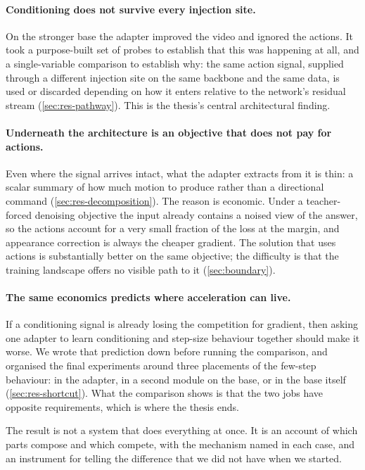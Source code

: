 \paragraph{Conditioning does not survive every injection site.} On the
stronger base the adapter improved the video and ignored the actions. It
took a purpose-built set of probes to establish that this was happening at
all, and a single-variable comparison to establish why: the same action
signal, supplied through a different injection site on the same backbone and
the same data, is used or discarded depending on how it enters relative to
the network's residual stream (\cref{sec:res-pathway}). This is the thesis's
central architectural finding.

\paragraph{Underneath the architecture is an objective that does not pay for
actions.} Even where the signal arrives intact, what the adapter extracts
from it is thin: a scalar summary of how much motion to produce rather than a
directional command (\cref{sec:res-decomposition}). The reason is economic.
Under a teacher-forced denoising objective the input already contains a
noised view of the answer, so the actions account for a very small fraction
of the loss at the margin, and appearance correction is always the cheaper
gradient. The solution that uses actions is substantially better on the same
objective; the difficulty is that the training landscape offers no visible
path to it (\cref{sec:boundary}).

\paragraph{The same economics predicts where acceleration can live.} If a
conditioning signal is already losing the competition for gradient, then
asking one adapter to learn conditioning and step-size behaviour together
should make it worse. We wrote that prediction down before running the
comparison, and organised the final experiments around three placements of
the few-step behaviour: in the adapter, in a second module on the base, or
in the base itself (\cref{sec:res-shortcut}). What the comparison shows is
that the two jobs have opposite requirements, which is where the thesis
ends.

\bigskip

The result is not a system that does everything at once. It is an account of
which parts compose and which compete, with the mechanism named in each
case, and an instrument for telling the difference that we did not have when
we started.

